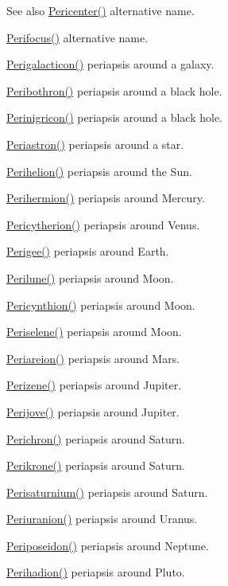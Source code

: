 \begin{DoxySeeAlso}{See also}
\hyperlink{group___astrophysics_gac4c419a87a5802cf6afc98f50792e99f}{Pericenter()} alternative name. 

\hyperlink{group___astrophysics_gaff62669fb364a245cb85f9a91d8ea71f}{Perifocus()} alternative name. 

\hyperlink{group___astrophysics_ga074fecab96b90bebffa512a37e52d90b}{Perigalacticon()} periapsis around a galaxy. 

\hyperlink{group___astrophysics_gada5892309279a3a687c4eb2f88238e4e}{Peribothron()} periapsis around a black hole. 

\hyperlink{group___astrophysics_ga99d86af90179994e17158b082c502fd4}{Perinigricon()} periapsis around a black hole. 

\hyperlink{group___astrophysics_ga477de6824cbb5986cdae923141e21648}{Periastron()} periapsis around a star. 

\hyperlink{group___astrophysics_ga941d285e3a0b48ada9c9f60925ff63c2}{Perihelion()} periapsis around the Sun. 

\hyperlink{group___astrophysics_ga9562e9cbfd73019ae9cdaa643b843d63}{Perihermion()} periapsis around Mercury. 

\hyperlink{group___astrophysics_gaa270e364cbbd7d3d6212872df484926f}{Pericytherion()} periapsis around Venus. 

\hyperlink{group___astrophysics_gae2d053caf69cb0b4c3207064a2ab143a}{Perigee()} periapsis around Earth. 

\hyperlink{group___astrophysics_ga2cc7ab05e18d32c94d8d74972e032793}{Perilune()} periapsis around Moon. 

\hyperlink{group___astrophysics_gaeeba153b188cd06cbd233eaef12f0a6a}{Pericynthion()} periapsis around Moon. 

\hyperlink{group___astrophysics_ga255874374dde571531e443cdbef9ef0c}{Periselene()} periapsis around Moon. 

\hyperlink{group___astrophysics_ga0617ba07a30b0fd0544c02f691bfae26}{Periareion()} periapsis around Mars. 

\hyperlink{group___astrophysics_ga0523c65b7fc26e675388b2c3d38aa00b}{Perizene()} periapsis around Jupiter. 

\hyperlink{group___astrophysics_ga075052f7ff9aa1d5fdf4501b493be86b}{Perijove()} periapsis around Jupiter. 

\hyperlink{group___astrophysics_ga12b5e99aa2e3e7031ef6ce93060cf516}{Perichron()} periapsis around Saturn. 

\hyperlink{group___astrophysics_gaa56f74c44a3583b8f0d13b821c1d7422}{Perikrone()} periapsis around Saturn. 

\hyperlink{group___astrophysics_ga60a50d09d29ebe47cbbfc125c2ea42bf}{Perisaturnium()} periapsis around Saturn. 

\hyperlink{group___astrophysics_gab8b8131a617dd2d2a4de1d48accd7442}{Periuranion()} periapsis around Uranus. 

\hyperlink{group___astrophysics_ga237e7af3794202c67e65f64f4c8abc2a}{Periposeidon()} periapsis around Neptune. 

\hyperlink{group___astrophysics_gafb16e46e55078b38604eef0d7c7c40c4}{Perihadion()} periapsis around Pluto. 
\end{DoxySeeAlso}
